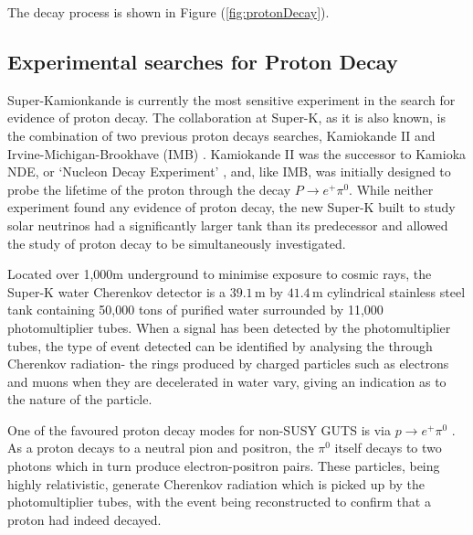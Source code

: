 \documentclass{article}
\begin{document}
The decay process is shown in Figure (\ref{fig:protonDecay}).

\subsection{Experimental searches for Proton Decay}%
\label{sec:GUTExp_PD}

Super-Kamionkande is currently the most sensitive experiment in the search for evidence of proton decay. The collaboration at Super-K, as it is also known, is the combination of two previous proton decays searches, Kamiokande II and Irvine-Michigan-Brookhave (IMB) \cite {IMB}. Kamiokande II was the successor to Kamioka NDE, or `Nucleon Decay Experiment' \cite{KamiokaNDE}, and, like IMB, was initially designed to probe the lifetime of the proton through the decay $P\rightarrow e^+ \pi^0$. While neither experiment found any evidence of proton decay, the new Super-K built to study solar neutrinos had a significantly larger tank than its predecessor and allowed the study of proton decay to be simultaneously investigated.

Located over 1,000m underground to minimise exposure to cosmic rays, the Super-K water Cherenkov detector is a $39.1\,$m by $41.4\,$m cylindrical stainless steel tank containing 50,000 tons of purified water \cite{SuperKSpecs} surrounded by 11,000 photomultiplier tubes. 
When a signal has been detected by the photomultiplier tubes, the type of event detected  can be identified by analysing the through Cherenkov radiation- the rings produced by charged particles such as electrons and muons when they are decelerated in water vary, giving an indication as to the nature of the particle.

One of the favoured proton decay modes for non-SUSY GUTS is via $p\rightarrow e^+ \pi^0$ . As a proton decays to a neutral pion and positron, the $\pi^0$ itself decays to two photons which in turn produce electron-positron pairs. These particles, being highly relativistic, generate Cherenkov radiation which is picked up by the photomultiplier tubes, with the event being reconstructed to confirm that a proton had indeed decayed.
\end{document}
